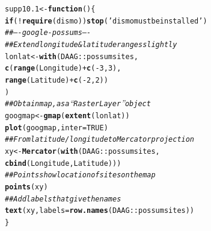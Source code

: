 \documentclass[12pt, a4paper,  BCOR=8.25mm, DIV=15]{scrartcl}\usepackage[]{graphicx}\usepackage[]{color}
\makeatletter
\newcommand{\hlnum}[1]{\textcolor[rgb]{0.686,0.059,0.569}{#1}}%
\newcommand{\hlstr}[1]{\textcolor[rgb]{0.192,0.494,0.8}{#1}}%
\newcommand{\hlcom}[1]{\textcolor[rgb]{0.678,0.584,0.686}{\textit{#1}}}%
\newcommand{\hlopt}[1]{\textcolor[rgb]{0,0,0}{#1}}%
\newcommand{\hlstd}[1]{\textcolor[rgb]{0.345,0.345,0.345}{#1}}%
\newcommand{\hlkwa}[1]{\textcolor[rgb]{0.161,0.373,0.58}{\textbf{#1}}}%
\newcommand{\hlkwb}[1]{\textcolor[rgb]{0.69,0.353,0.396}{#1}}%
\newcommand{\hlkwc}[1]{\textcolor[rgb]{0.333,0.667,0.333}{#1}}%
\newcommand{\hlkwd}[1]{\textcolor[rgb]{0.737,0.353,0.396}{\textbf{#1}}}%
\newenvironment{kframe}{%
 \def\at@end@of@kframe{}%
 \ifinner\ifhmode%
  \def\at@end@of@kframe{\end{minipage}}%
  \begin{minipage}{\columnwidth}%
 \fi\fi%
 \def\FrameCommand##1{\hskip\@totalleftmargin \hskip-\fboxsep
 \colorbox{shadecolor}{##1}\hskip-\fboxsep
     \hskip-\linewidth \hskip-\@totalleftmargin \hskip\columnwidth}%
 \MakeFramed {\advance\hsize-\width
   \@totalleftmargin\z@ \linewidth\hsize
   \@setminipage}}%
 {\par\unskip\endMakeFramed%
 \at@end@of@kframe}
\newenvironment{knitrout}{}{} %
\makeatother
\begin{document}
\begin{knitrout}
\color{fgcolor}\begin{kframe}
\begin{alltt}
\hlstd{supp10.1} \hlkwb{<-} \hlkwa{function}\hlstd{()\{}
\hlkwa{if}\hlstd{(}\hlopt{!}\hlkwd{require}\hlstd{(dismo))}\hlkwd{stop}\hlstd{(}\hlstr{'dismo must be installed'}\hlstd{)}
\hlcom{## ---- google-possums ----}
\hlcom{## Extend longitude & latitude ranges slightly}
\hlstd{lonlat} \hlkwb{<-} \hlkwd{with}\hlstd{(DAAG}\hlopt{::}\hlstd{possumsites,}
               \hlkwd{c}\hlstd{(}\hlkwd{range}\hlstd{(Longitude)}\hlopt{+}\hlkwd{c}\hlstd{(}\hlopt{-}\hlnum{3}\hlstd{,}\hlnum{3}\hlstd{),}
                 \hlkwd{range}\hlstd{(Latitude)}\hlopt{+}\hlkwd{c}\hlstd{(}\hlopt{-}\hlnum{2}\hlstd{,}\hlnum{2}\hlstd{))}
\hlstd{)}
\hlcom{## Obtain map, as a ``RasterLayer'' object}
\hlstd{googmap} \hlkwb{<-} \hlkwd{gmap}\hlstd{(}\hlkwd{extent}\hlstd{(lonlat))}
\hlkwd{plot}\hlstd{(googmap,} \hlkwc{inter}\hlstd{=}\hlnum{TRUE}\hlstd{)}
\hlcom{## From latitude/longitude to Mercator projection}
\hlstd{xy} \hlkwb{<-} \hlkwd{Mercator}\hlstd{(}\hlkwd{with}\hlstd{(DAAG}\hlopt{::}\hlstd{possumsites,}
                    \hlkwd{cbind}\hlstd{(Longitude, Latitude)))}
\hlcom{## Points show location of sites on the map}
\hlkwd{points}\hlstd{(xy)}
\hlcom{## Add labels that give the names}
\hlkwd{text}\hlstd{(xy,} \hlkwc{labels}\hlstd{=}\hlkwd{row.names}\hlstd{(DAAG}\hlopt{::}\hlstd{possumsites))}
\hlstd{\}}
\end{alltt}
\end{kframe}
\end{knitrout}
\end{document}

